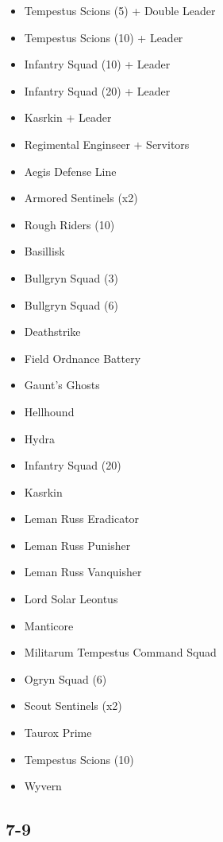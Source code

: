 \documentclass{HordeModeTarot}
\begin{document}
\begin{multicols}{2}
\begin{itemize}[leftmargin=*]
\item[] Tempestus Scions (5) + Double Leader
\item[] Tempestus Scions (10) + Leader
\item[] Infantry Squad (10) + Leader
\item[] Infantry Squad (20) + Leader
\item[] Kasrkin + Leader
\item[] Regimental Enginseer + Servitors
\item[] Aegis Defense Line
\item[] Armored Sentinels (x2)
\item[] Rough Riders (10)
\item[] Basillisk
\item[] Bullgryn Squad (3)
\item[] Bullgryn Squad (6)
\item[] Deathstrike
\item[] Field Ordnance Battery
\item[] Gaunt's Ghosts
\item[] Hellhound
\item[] Hydra
\item[] Infantry Squad (20)
\item[] Kasrkin
\item[] Leman Russ Eradicator
\item[] Leman Russ Punisher
\item[] Leman Russ Vanquisher
\item[] Lord Solar Leontus
\item[] Manticore
\item[] Militarum Tempestus Command Squad
\item[] Ogryn Squad (6)
\item[] Scout Sentinels (x2)
\item[] Taurox Prime
\item[] Tempestus Scions (10)
\item[] Wyvern
\end{itemize}

\subsection*{7-9}


\end{multicols}
\end{document}
